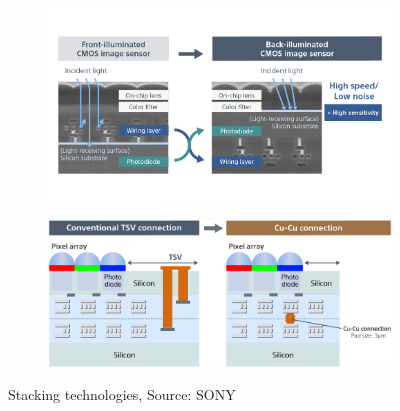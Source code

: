 \begin{figure}[htbp]
    \centering
    \begin{subfigure}[t]{0.8\textwidth} %
        \centering
        \includegraphics[width=\textwidth]{chapters/introduction/image/front_backside_illumination.jpg} %
        \caption{}
        \label{}
    \end{subfigure}
    \hfill %
    \begin{subfigure}[t]{0.8\textwidth} %
        \centering
        \includegraphics[width=\textwidth]{chapters/introduction/image/stacking.jpg} %
        \caption{}
        \label{}
    \end{subfigure}

    \caption{Stacking technologies, Source: SONY}
    \label{fig:ch1:backside_and_stacking}
\end{figure}

